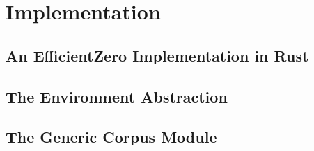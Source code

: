 
\chapter{Implementation}\label{chap:implementation}


\section{An EfficientZero Implementation in Rust}\label{sec:impl-efficientzero}


\section{The Environment Abstraction}\label{sec:impl-abstraction}


\section{The Generic Corpus Module}\label{sec:impl-corpus}


